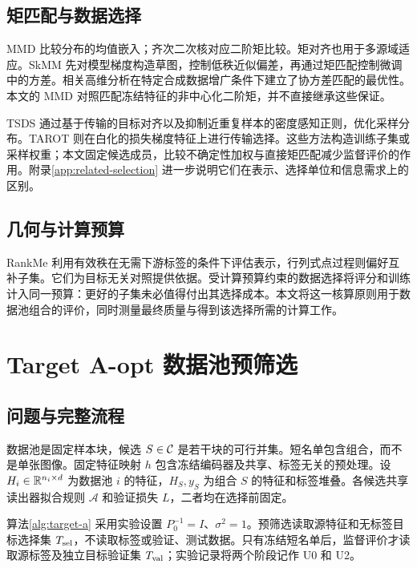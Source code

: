 \subsection{矩匹配与数据选择}
MMD 比较分布的均值嵌入\citep{gretton2012}；齐次二次核对应二阶矩比较。矩对齐也用于多源域适应\citep{peng2019}。SkMM 先对模型梯度构造草图，控制低秩近似偏差，再通过矩匹配控制微调中的方差\citep{dong2024skmm}。相关高维分析在特定合成数据增广条件下建立了协方差匹配的最优性\citep{rezaei2026synthetic}。本文的 MMD 对照匹配冻结特征的非中心化二阶矩，并不直接继承这些保证。

TSDS 通过基于传输的目标对齐以及抑制近重复样本的密度感知正则，优化采样分布\citep{liu2024tsds}。TAROT 则在白化的损失梯度特征上进行传输选择\citep{feng2025tarot}。这些方法构造训练子集或采样权重；本文固定候选成员，比较不确定性加权与直接矩匹配减少监督评价的作用。附录\ref{app:related-selection} 进一步说明它们在表示、选择单位和信息需求上的区别。

\subsection{几何与计算预算}
RankMe 利用有效秩在无需下游标签的条件下评估表示\citep{garrido2023rankme}，行列式点过程则偏好互补子集\citep{kulesza2012}。它们为目标无关对照提供依据。受计算预算约束的数据选择将评分和训练计入同一预算\citep{yin2025}：更好的子集未必值得付出其选择成本。本文将这一核算原则用于数据池组合的评价，同时测量最终质量与得到该选择所需的计算工作。

\section{Target A-opt 数据池预筛选}
\label{sec:problem}
\label{sec:theory}
\subsection{问题与完整流程}
数据池是固定样本块，候选 $S\in\mathcal{C}$ 是若干块的可行并集。短名单包含组合，而不是单张图像。固定特征映射 $h$ 包含冻结编码器及共享、标签无关的预处理。设 $H_i\in\mathbb{R}^{n_i\times d}$ 为数据池 $i$ 的特征，$H_S,y_S$ 为组合 $S$ 的特征和标签堆叠。各候选共享读出器拟合规则 $\mathcal A$ 和验证损失 $L$，二者均在选择前固定。

算法\ref{alg:target-a} 采用实验设置 $P_0^{-1}=I$、$\sigma^2=1$。预筛选读取源特征和无标签目标选择集 $T_{\rm sel}$，不读取标签或验证、测试数据。只有冻结短名单后，监督评价才读取源标签及独立目标验证集 $T_{\rm val}$；实验记录将两个阶段记作 U0 和 U2。

